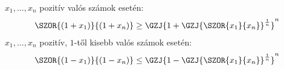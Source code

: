 $x_1,\ldots,x_n$ pozitív valós számok esetén:
\begin{gather*}
\SZOR{(1+x_1)}{(1+x_n)} \ge \GZJ{1+\GZJ{\SZOR{x_1}{x_n}}^{\frac{1}{n}}}^{n}\\
\end{gather*}
$x_1,\ldots,x_n$ pozitív, $1$-től kisebb valós számok esetén:
\begin{gather*}
\SZOR{(1-x_1)}{(1-x_n)} \le \GZJ{1-\GZJ{\SZOR{x_1}{x_n}}^{\frac{1}{n}}}^{n}\\
\end{gather*}
